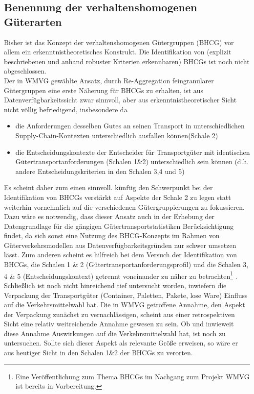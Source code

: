 % 
\subsection{Benennung der \glqq verhaltenshomogenen Güterarten\grqq }
\label{_Toc363572053}
\label{_Toc363601750}
\label{_Toc365801613}
\label{_Toc366766123}
\label{_Toc366775317}

\label{_Toc363572054}
\label{_Toc363601751}Bisher ist das Konzept der verhaltenshomogenen Gütergruppen (BHCG) vor allem ein erkenntnistheoretisches Konstrukt. Die Identifikation von (explizit beschriebenen und anhand robuster Kriterien erkennbaren) BHCGs ist noch nicht abgeschlossen.~\\
Der in WMVG gewählte Ansatz, durch Re-Aggregation feingranularer Gütergruppen eine erste Näherung für BHCGs zu erhalten, ist aus Datenverfügbarkeitssicht zwar sinnvoll, aber aus erkenntnistheoretischer Sicht nicht völlig befriedigend, insbesondere da ~\\

\begin{itemize}
%
   \item die Anforderungen desselben Gutes an seinen Transport in unterschiedlichen Supply-Chain-Kontexten unterschiedlich ausfallen können(Schale 2)
   \item die Entscheidungskontexte der Entscheider für Transportgüter mit identischen Gütertransportanforderungen (Schalen 1\&2) unterschiedlich sein können (d.h. andere Entscheidungskriterien in den Schalen 3,4 und 5)
%
\end{itemize}
Es scheint daher zum einen sinnvoll. künftig den Schwerpunkt bei der Identifikation von BHCGs verstärkt auf Aspekte der Schale 2 zu legen statt weiterhin vornehmlich auf die verschiedenen Gütergruppierungen zu fokussieren. Dazu wäre es notwendig, dass dieser Ansatz auch in der Erhebung der Datengrundlage für die gängigen Gütertransportstatistiken Berücksichtigung findet, da sich sonst eine Nutzung des BHCG-Konzepts im Rahmen von Güterverkehrsmodellen aus Datenverfügbarkeitsgründen nur schwer umsetzen lässt. Zum anderen scheint es hilfreich bei dem Versuch der Identifikation von BHCGs, die Schalen 1 \& 2 (Gütertransportanforderungsprofil) und die Schalen 3, 4 \& 5 (Entscheidungskontext) getrennt voneinander zu näher zu betrachten\footnote{%
 Eine Veröffentlichung zum Thema BHCGs im Nachgang zum Projekt WMVG ist bereits in Vorbereitung.
}%
.~\\
Schließlich ist noch nicht hinreichend tief untersucht worden, inwiefern die Verpackung der Transportgüter (Container, Paletten, Pakete, lose Ware) Einfluss auf die Verkehrsmittelwahl hat. Die in WMVG getroffene Annahme, den Aspekt der Verpackung zunächst zu vernachlässigen, scheint aus einer retrospektiven Sicht eine relativ weitreichende Annahme gewesen zu sein. Ob und inwieweit diese Annahme Auswirkungen auf die Verkehrsmittelwahl hat, ist noch zu untersuchen. Sollte sich dieser Aspekt als relevante Größe erweisen, so wäre er aus heutiger Sicht in den Schalen 1\&2 der BHCGs zu verorten.~\\


